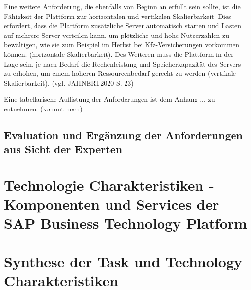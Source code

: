 Eine weitere Anforderung, die ebenfalls von Beginn an erfüllt sein sollte, ist die Fähigkeit der Plattform zur horizontalen und vertikalen Skalierbarkeit. Dies erfordert, dass die Plattform zusätzliche Server automatisch starten und Lasten auf mehrere Server verteilen kann, um plötzliche und hohe Nutzerzahlen zu bewältigen, wie sie zum Beispiel im Herbst bei Kfz-Versicherungen vorkommen können. (horizontale Skalierbarkeit). Des Weiteren muss die Plattform in der Lage sein, je nach Bedarf die Rechenleistung und Speicherkapazität des Servers zu erhöhen, um einem höheren Ressourcenbedarf gerecht zu werden (vertikale Skalierbarkeit). (vgl. JAHNERT2020 S. 23)

Eine tabellarische Auflistung der Anforderungen ist dem Anhang ... zu entnehmen. (kommt noch)











\subsection{Evaluation und Ergänzung der Anforderungen aus Sicht der Experten}

\section{Technologie Charakteristiken - Komponenten und Services der SAP Business Technology Platform}\label{sec:TechCharak}

\section{Synthese der Task und Technology Charakteristiken}


